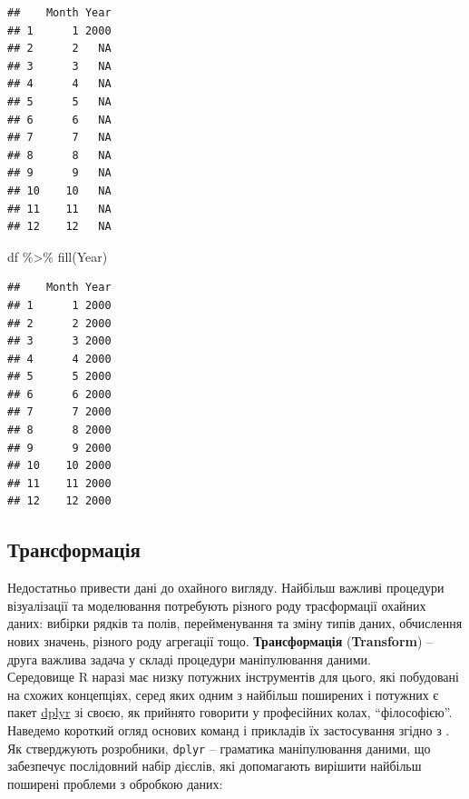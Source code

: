 \documentclass[
]{book}
\newenvironment{Shaded}{\begin{snugshade}}{\end{snugshade}}
\newcommand{\FunctionTok}[1]{\textcolor[rgb]{0.00,0.00,0.00}{#1}}
\newcommand{\NormalTok}[1]{#1}
\newcommand{\SpecialCharTok}[1]{\textcolor[rgb]{0.00,0.00,0.00}{#1}}
\begin{document}
\begin{verbatim}
##    Month Year
## 1      1 2000
## 2      2   NA
## 3      3   NA
## 4      4   NA
## 5      5   NA
## 6      6   NA
## 7      7   NA
## 8      8   NA
## 9      9   NA
## 10    10   NA
## 11    11   NA
## 12    12   NA
\end{verbatim}

\begin{Shaded}
\begin{Highlighting}[]
\NormalTok{df }\SpecialCharTok{\%\textgreater{}\%} \FunctionTok{fill}\NormalTok{(Year)}
\end{Highlighting}
\end{Shaded}

\begin{verbatim}
##    Month Year
## 1      1 2000
## 2      2 2000
## 3      3 2000
## 4      4 2000
## 5      5 2000
## 6      6 2000
## 7      7 2000
## 8      8 2000
## 9      9 2000
## 10    10 2000
## 11    11 2000
## 12    12 2000
\end{verbatim}

\hypertarget{ux442ux440ux430ux43dux441ux444ux43eux440ux43cux430ux446ux456ux44f}{%
\subsection{Трансформація}\label{ux442ux440ux430ux43dux441ux444ux43eux440ux43cux430ux446ux456ux44f}}

Недостатньо привести дані до охайного вигляду. Найбільш важливі процедури візуалізації та моделювання потребують різного роду трасформації охайних даних: вибірки рядків та полів, перейменування та зміну типів даних, обчислення нових значень, різного роду агрегації тощо.
\textbf{Трансформація} (\textbf{Transform}) -- друга важлива задача у складі процедури маніпулювання даними.\\
Середовище R наразі має низку потужних інструментів для цього, які побудовані на схожих концепціях, серед яких одним з найбільш поширених і потужних є пакет \href{https://cran.r-project.org/web/packages/dplyr/}{dplyr} \citep{dplyr} зі своєю, як прийнято говорити у професійних колах, ``філософією''.\\
Наведемо короткий огляд основих команд і прикладів їх застосування згідно з \citep{tvdplyr}.\\
Як стверджують розробники, \texttt{dplyr} -- граматика маніпулювання даними, що забезпечує послідовний набір дієслів, які допомагають вирішити найбільш поширені проблеми з обробкою даних:
\end{document}
